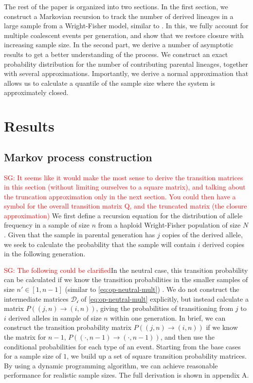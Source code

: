 \documentclass[review]{elsarticle}
\newcommand{\ra}{\rightarrow}
\newcommand{\sgcomment}[1]{\textcolor{red}{SG: #1}}
\begin{document}
The rest of the paper is organized into two sections. In the first section, we construct a Markovian
recursion to track the number of derived lineages in a large sample from a Wright-Fisher model,
similar to \citep{JouganousEtAl2017,KammEtAl2017}. In this, we fully account for multiple coalescent
events per generation, and show that we restore closure with increasing sample size. In the second
part, we derive a number of asymptotic results to get a better understanding of the process. We
construct an exact probability distribution for the number of contributing parental lineages,
together with several approximations. Importantly, we derive a normal approximation that allows us
to calculate a quantile of the sample size where the system is approximately closed.

\section{Results}
\label{sec:results}

\subsection{Markov process construction}
\label{subsec:markov}
\sgcomment{It seems like it would make the most sense to derive the transition matrices in this section (without limiting ourselves to a square matrix), and talking about the truncation approximation only in the next section. You could then have a symbol for the overall transition matrix Q, and the truncated matrix (the closure approximation)}
We first define a recursion equation for the distribution of allele frequency in a sample of size
$n$ from a haploid Wright-Fisher population of size $N$. Given that the sample in parental generation
has $j$ copies of the derived allele, we seek to calculate the probability that the sample
will contain $i$ derived copies in the following generation.

\sgcomment{The following could be clarified}In the neutral case, this transition probability can be calculated if we know the transition
probabilities in the smaller samples of size $n' \in [1, n-1]$ (similar to
\eqref{eq:op-neutral-mult}) \citep{BhaskarEtAl2014}. We do not construct the intermediate matrices
$\mathcal{D_i}$ of \eqref{eq:op-neutral-mult} explicitly, but instead calculate a matrix
$P((j,n)\ra(i,n))$, giving the probabilities of transitioning from $j$ to $i$ derived alleles in
sample of size $n$ within one generation. In brief, we can construct the transition probability
matrix $P((j,n)\ra(i,n))$ if we know the matrix for $n-1$, $P((\cdot,n-1)\ra(\cdot,n-1))$, and then
use the conditional probabilities for each type of an event. Starting from the base cases for a
sample size of $1$, we build up a set of square transition probability matrices. By using a dynamic
programming algorithm, we can achieve reasonable performance for realistic sample sizes. The full
derivation is shown in appendix A.
\end{document}
